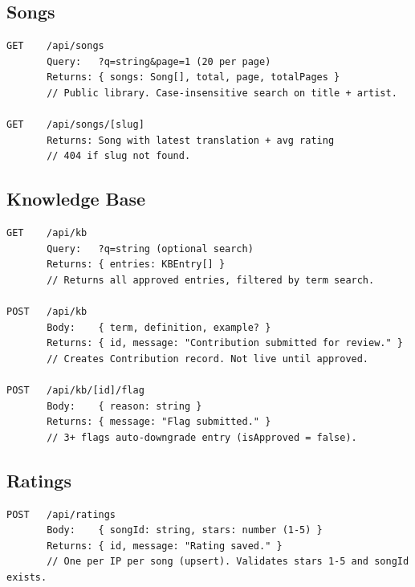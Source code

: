 \documentclass[12pt, a4paper]{article}
\begin{document}
\subsection{Songs}

\begin{tcolorbox}[codebox]
\begin{lstlisting}
GET    /api/songs
       Query:   ?q=string&page=1 (20 per page)
       Returns: { songs: Song[], total, page, totalPages }
       // Public library. Case-insensitive search on title + artist.

GET    /api/songs/[slug]
       Returns: Song with latest translation + avg rating
       // 404 if slug not found.
\end{lstlisting}
\end{tcolorbox}

\subsection{Knowledge Base}

\begin{tcolorbox}[codebox]
\begin{lstlisting}
GET    /api/kb
       Query:   ?q=string (optional search)
       Returns: { entries: KBEntry[] }
       // Returns all approved entries, filtered by term search.

POST   /api/kb
       Body:    { term, definition, example? }
       Returns: { id, message: "Contribution submitted for review." }
       // Creates Contribution record. Not live until approved.

POST   /api/kb/[id]/flag
       Body:    { reason: string }
       Returns: { message: "Flag submitted." }
       // 3+ flags auto-downgrade entry (isApproved = false).
\end{lstlisting}
\end{tcolorbox}

\subsection{Ratings}

\begin{tcolorbox}[codebox]
\begin{lstlisting}
POST   /api/ratings
       Body:    { songId: string, stars: number (1-5) }
       Returns: { id, message: "Rating saved." }
       // One per IP per song (upsert). Validates stars 1-5 and songId exists.
\end{lstlisting}
\end{tcolorbox}
\end{document}

